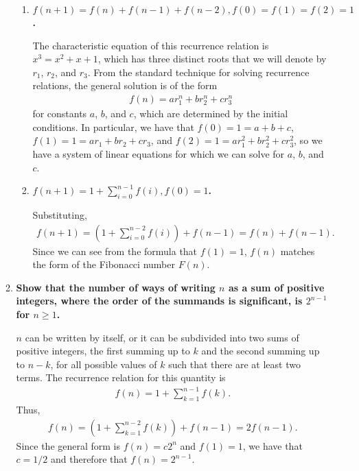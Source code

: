 \documentclass[a4paper,12pt]{article}
\begin{document}
\begin{enumerate}
\begin{enumerate}
\begin{enumerate}
                    \item
                        \boldmath
                        \textbf{$f(n + 1) = f(n) + f(n - 1) + f(n - 2), f(0) = f(1) = f(2) = 1$.} \par
                        \unboldmath
                        The characteristic equation of this recurrence relation is $x^3 = x^2 + x + 1$, which has three distinct roots that we will denote by $r_1$, $r_2$, and $r_3$. From the standard technique for solving recurrence relations, the general solution is of the form
                        \begin{align*}
                            f(n) = ar_1^n + br_2^n + cr_3^n
                        \end{align*}
                        for constants $a$, $b$, and $c$, which are determined by the initial conditions. In particular, we have that $f(0) = 1 = a + b + c$, $f(1) = 1 = ar_1 + br_2 + cr_3$, and $f(2) = 1 = ar_1^2 + br_2^2 + cr_3^2$, so we have a system of linear equations for which we can solve for $a$, $b$, and $c$.

                    \item
                        \boldmath
                        \textbf{$f(n + 1) = 1 + \sum_{i = 0}^{n - 1} f(i), f(0) = 1$.} \par
                        \unboldmath
                        Substituting,
                        \begin{align*}
                            f(n + 1) = \left( 1 + \sum_{i = 0}^{n - 2} f(i) \right) + f(n - 1) = f(n) + f(n - 1).
                        \end{align*}
                        Since we can see from the formula that $f(1) = 1$, $f(n)$ matches the form of the Fibonacci number $F(n)$.
                \end{enumerate}

            \item
                \boldmath
                \textbf{Show that the number of ways of writing $n$ as a sum of positive integers, where the order of the summands is significant, is $2^{n - 1}$ for $n \geq 1$.} \par
                \unboldmath
                $n$ can be written by itself, or it can be subdivided into two sums of positive integers, the first summing up to $k$ and the second summing up to $n - k$, for all possible values of $k$ such that there are at least two terms. The recurrence relation for this quantity is
                \begin{align*}
                    f(n) = 1 + \sum_{k = 1}^{n - 1} f(k).
                \end{align*}
                Thus,
                \begin{align*}
                    f(n) = \left( 1 + \sum_{k = 1}^{n - 2} f(k) \right) + f(n - 1) = 2f(n - 1).
                \end{align*}
                Since the general form is $f(n) = c2^n$ and $f(1) = 1$, we have that $c = 1/2$ and therefore that $f(n) = 2^{n - 1}$.
        \end{enumerate}


\end{enumerate}
\end{document}
